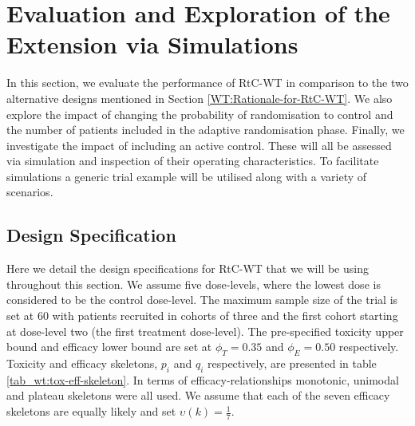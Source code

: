 \section{Evaluation and Exploration of the Extension via Simulations}
\label{WT:Evaluation-of-the-Extension}

In this section, we evaluate the performance of RtC-WT in comparison to the two alternative designs mentioned in Section \ref{WT:Rationale-for-RtC-WT}. We also explore the impact of changing the probability of randomisation to control and the number of patients included in the adaptive randomisation phase. Finally, we investigate the impact of including an active control. These will all be assessed via simulation and inspection of their operating characteristics. To facilitate simulations a generic trial example will be utilised along with a variety of scenarios. 

\subsection{Design Specification}
\label{WT:Design-Spec}

Here we detail the design specifications for RtC-WT that we will be using throughout this section. We assume five dose-levels, where the lowest dose is considered to be the control dose-level. The maximum sample size of the trial is set at 60 with patients recruited in cohorts of three and the first cohort starting at dose-level two (the first treatment dose-level). The pre-specified toxicity upper bound and efficacy lower bound are set at $\phi_T = 0.35$ and $\phi_E = 0.50$ respectively. Toxicity and efficacy skeletons, $p_i$ and $q_i$ respectively, are presented in table \ref{tab_wt:tox-eff-skeleton}. In terms of efficacy-relationships monotonic, unimodal and plateau skeletons were all used. We assume that each of the seven efficacy skeletons are equally likely and set $\upsilon(k) = \frac{1}{7}$. 


